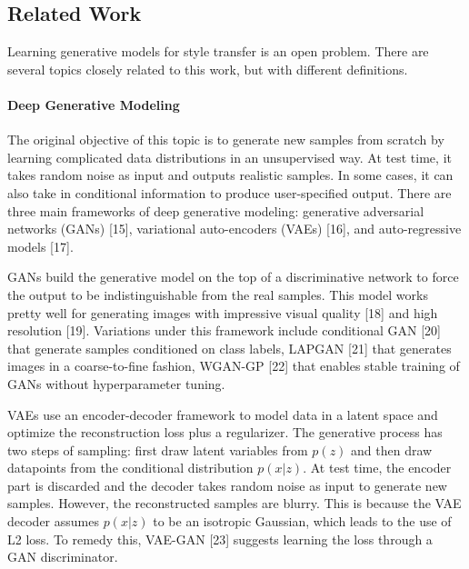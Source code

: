 \documentclass{article}
\begin{document}


\subsection{Related Work}
Learning generative models for style transfer is an open problem. There are several topics closely related to this work, but with different definitions.

\paragraph{Deep Generative Modeling}
The original objective of this topic is to generate new samples from scratch by learning complicated data distributions in an unsupervised way. At test time, it takes random noise as input and outputs realistic samples. In some cases, it can also take in conditional information to produce user-specified output. There are three main frameworks of deep generative modeling: generative adversarial networks (GANs) [15], variational auto-encoders (VAEs) [16], and auto-regressive models [17].

GANs build the generative model on the top of a discriminative network to force the output to be indistinguishable from the real samples. This model works pretty well for generating images with impressive visual quality [18] and high resolution [19]. Variations under this framework include conditional GAN [20] that generate samples conditioned on class labels, LAPGAN [21] that generates images in a coarse-to-fine fashion, WGAN-GP [22] that enables stable training of GANs without hyperparameter tuning.

VAEs use an encoder-decoder framework to model data in a latent space and optimize the reconstruction loss plus a regularizer. The generative process has two steps of sampling: first draw latent variables from $p(z)$ and then draw datapoints from the conditional distribution $p(x|z)$. At test time, the encoder part is discarded and the decoder takes random noise as input to generate new samples. However, the reconstructed samples are blurry. This is because the VAE decoder assumes $p(x|z)$ to be an isotropic Gaussian, which leads to the use of L2 loss. To remedy this, VAE-GAN [23] suggests learning the loss through a GAN discriminator.
\end{document}
